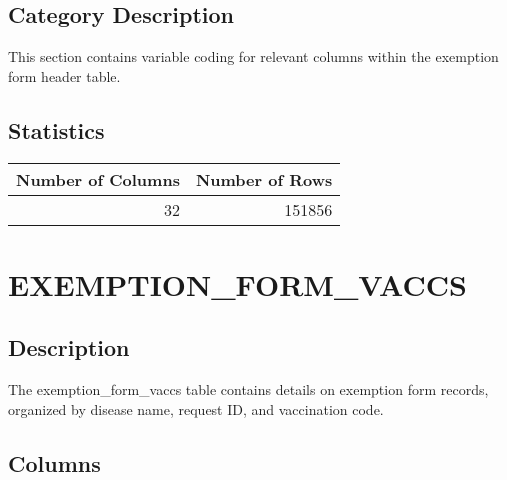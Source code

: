 \documentclass[
  letterpaper,
  DIV=11,
  numbers=noendperiod]{scrreprt}
\begin{document}
\hypertarget{category-description-8}{%
\section*{Category Description}\label{category-description-8}}

This section contains variable coding for relevant columns within the
exemption form header table.

\hypertarget{statistics-8}{%
\section*{Statistics}\label{statistics-8}}

\begin{longtable}{rr}
\toprule
Number of Columns & Number of Rows \\ 
\midrule
32 & 151856 \\ 
\bottomrule
\end{longtable}

\hypertarget{exemption_form_vaccs}{%
\chapter*{EXEMPTION\_FORM\_VACCS}\label{exemption_form_vaccs}}

\hypertarget{description-9}{%
\section*{Description}\label{description-9}}

The exemption\_form\_vaccs table contains details on exemption form
records, organized by disease name, request ID, and vaccination code.

\hypertarget{columns-9}{%
\section*{Columns}\label{columns-9}}
\end{document}
